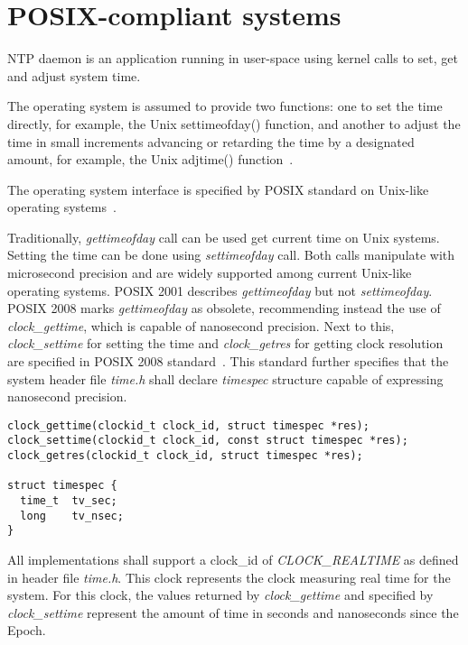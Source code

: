 
\section{POSIX-compliant systems}\label{sec:others-posix}
NTP daemon is an application running in user-space using kernel calls to set, get and
adjust system time.

The operating system is assumed to provide two
functions: one to set the time directly, for example, the Unix
settimeofday() function, and another to adjust the time in small
increments advancing or retarding the time by a designated amount,
for example, the Unix adjtime() function~\cite{rfc5905}.

The operating system interface is specified by POSIX standard on Unix-like operating systems~\cite{posix}.

Traditionally, {\it{gettimeofday}} call can be used get current time on Unix systems.
Setting the time can be done using {\it{settimeofday}} call.
Both calls manipulate with microsecond precision and
are widely supported among current Unix-like operating systems.
POSIX 2001 describes {\it{gettimeofday}} but not {\it{settimeofday}}.
POSIX 2008 marks {\it{gettimeofday}} as obsolete, recommending instead the use
of {\it{clock\_gettime}}, which is capable of nanosecond precision.
Next to this, {\it{clock\_settime}} for setting the time and {\it{clock\_getres}}
for getting clock resolution are specified in POSIX 2008 standard~\cite{posix}.
This standard further specifies that
the system header file {\it{time.h}} shall declare {\it{timespec}} structure
capable of expressing nanosecond precision.
\begin{lstlisting}[morekeywords={clockid_t,time_t}]
clock_gettime(clockid_t clock_id, struct timespec *res);
clock_settime(clockid_t clock_id, const struct timespec *res);
clock_getres(clockid_t clock_id, struct timespec *res);

struct timespec {
  time_t  tv_sec;
  long    tv_nsec;
}
\end{lstlisting}
All implementations shall support a clock\_id of {\it{CLOCK\_REALTIME}} as
defined in header file {\it{time.h}}.
This clock represents the clock measuring real time for the system.
For this clock, the values returned by {\it{clock\_gettime}} and specified
by {\it{clock\_settime}} represent the amount
of time in seconds and nanoseconds since the Epoch.


